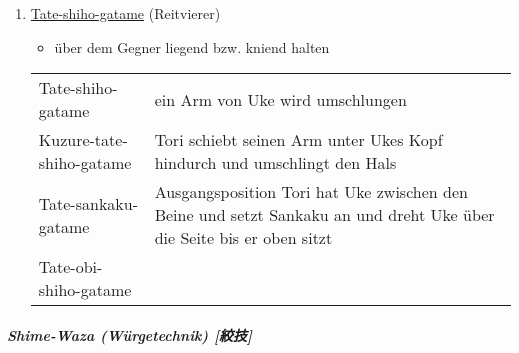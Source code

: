 \documentclass[justified, a4paper, notitlepage, captions=tableheading, nobib]{tufte-handout}
\begin{document}
\begin{enumerate}
\item \hyperref[orga2331bb]{Tate-shiho-gatame} (Reitvierer)
\label{sec:org091334b}

\begin{itemize}
\item über dem Gegner liegend bzw. kniend halten
\end{itemize}

\begin{center}
\begin{tabular}{ll}
\label{orga2331bb}Tate-shiho-gatame & ein Arm von Uke wird umschlungen\\
\label{org13348d8}Kuzure-tate-shiho-gatame & Tori schiebt seinen Arm unter Ukes Kopf hindurch und umschlingt den Hals\\
\label{org1230ab7}Tate-sankaku-gatame & Ausgangsposition Tori hat Uke zwischen den Beine und setzt Sankaku an und dreht Uke über die Seite bis er oben sitzt\\
\label{org43dc6de}Tate-obi-shiho-gatame & \\
\end{tabular}
\end{center}
\end{enumerate}


\subparagraph{Shime-Waza (Würgetechnik) [絞技] }
\label{sec:org77c8662}
\end{document}

